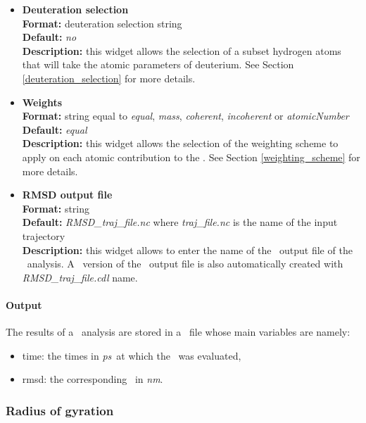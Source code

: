 \documentclass[a4paper,11pt]{report}
\newcommand{\nm}{\textit{nm}}
\newcommand{\ps}{\textit{ps}}
\begin{document}
\begin{itemize}
\item \textbf{Deuteration selection}\\
\textbf{Format:} deuteration selection string\\
\textbf{Default:} \textit{no}\\
\textbf{Description:} this widget allows the selection of a subset hydrogen atoms that will take the atomic parameters 
of deuterium. See Section \ref{deuteration_selection} for more details.

\item \textbf{Weights}\\
\textbf{Format:} string equal to \textit{equal}, \textit{mass}, \textit{coherent}, \textit{incoherent} or \textit{atomicNumber}\\
\textbf{Default:} \textit{equal}\\
\textbf{Description:} this widget allows the selection of the weighting scheme to apply on each atomic contribution 
to the \RMSD . See Section \ref{weighting_scheme} for more details. 

\item \textbf{RMSD output file}\\
\textbf{Format:} string\\
\textbf{Default:} \textit{RMSD\_traj\_file.nc} where \textit{traj\_file.nc} is the name of the input trajectory\\
\textbf{Description:} this widget allows to enter the name of the \NetCDF\ output file of the \RMSD\ analysis. A \CDL\ 
version of the \NetCDF\ output file is also automatically created with \textit{RMSD\_traj\_file.cdl} name.
\end{itemize}

\paragraph{Output\\}
The results of a \RMSD\ analysis are stored in a \NetCDF\ file whose main variables are namely:
\begin{itemize}
\item time: the times in \ps\ at which the \RMSD\ was evaluated,
\item rmsd: the corresponding \RMSD\ in \nm .
\end{itemize}

\subsubsection{Radius of gyration}
\label{rog}
\end{document}

